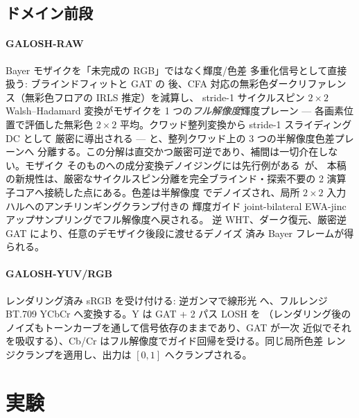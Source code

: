 \documentclass[journal]{IEEEtran}
\begin{document}
\subsection{ドメイン前段}
\paragraph{GALOSH-RAW} Bayer モザイクを「未完成の RGB」ではなく輝度/色差
多重化信号として直接扱う: ブラインドフィットと GAT の
後、CFA 対応の無彩色ダークリファレンス（無彩色フロアの IRLS 推定）を減算し、
stride-1 サイクルスピン $2{\times}2$ Walsh--Hadamard 変換がモザイクを
1 つの\emph{フル解像度}輝度プレーン --- 各画素位置で評価した無彩色
$2{\times}2$ 平均。クワッド整列変換から stride-1 スライディング DC として
厳密に導出される --- と、整列クワッド上の 3 つの半解像度色差プレーンへ
分離する。この分解は直交かつ厳密可逆であり、補間は一切介在しない。モザイク
そのものへの成分変換デノイジングには先行例がある~\cite{hirakawa,park09}が、
本稿の新規性は、厳密なサイクルスピン分離を完全ブラインド・探索不要の
2 演算子コアへ接続した点にある。色差は半解像度
でデノイズされ、局所 $2{\times}2$ 入力ハルへのアンチリンギングクランプ付きの
輝度ガイド joint-bilateral EWA-jinc アップサンプリングでフル解像度へ戻される。
逆 WHT、ダーク復元、厳密逆 GAT により、任意のデモザイク後段に渡せるデノイズ
済み Bayer フレームが得られる。

\paragraph{GALOSH-YUV/RGB} レンダリング済み sRGB を受け付ける: 逆ガンマで線形光
へ、フルレンジ BT.709 YCbCr へ変換する。Y は GAT + 2 パス LOSH を
（レンダリング後のノイズもトーンカーブを通して信号依存のままであり、GAT が一次
近似でそれを吸収する）、Cb/Cr はフル解像度でガイド回帰を受ける。同じ局所色差
レンジクランプを適用し、出力は $[0,1]$ へクランプされる。

\section{実験}
\end{document}
